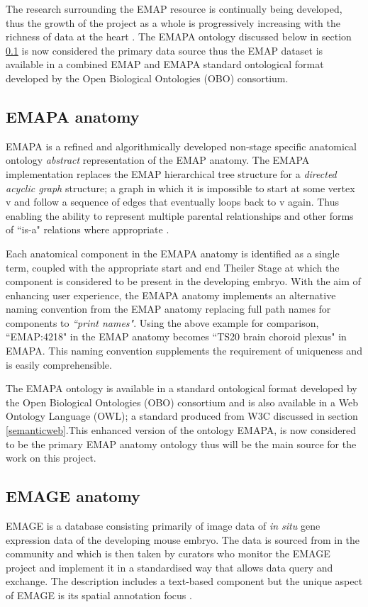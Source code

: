 The research surrounding the EMAP resource is continually being developed, thus the growth of the project as a whole is progressively increasing with the richness of data at the heart \cite{emap}. The EMAPA ontology discussed below in section \ref{emapaanatomy} is now considered the primary data source thus the EMAP dataset is available in a combined EMAP and EMAPA standard ontological format developed by the Open Biological Ontologies (OBO) consortium.

\subsection{EMAPA anatomy}\label{emapaanatomy}
EMAPA is a refined and algorithmically developed non-stage specific anatomical ontology \textit{abstract} representation of the EMAP anatomy. The EMAPA implementation replaces the EMAP hierarchical tree structure for a \textit{directed acyclic graph} structure; a graph in which it is impossible to start at some vertex v and follow a sequence of edges that eventually loops back to v again. Thus enabling the ability to represent multiple parental relationships and other forms of ``is-a" relations where appropriate \cite{emap}.

Each anatomical component in the EMAPA anatomy is identified as a single term, coupled with the appropriate start and end Theiler Stage at which the component is considered to be present in the developing embryo. \cite{emap} With the aim of enhancing user experience, the EMAPA anatomy  implements an alternative naming convention from the EMAP anatomy replacing full path names for components to \textit{``print names"}. Using the above example for comparison, ``EMAP:4218" in the EMAP anatomy becomes ``TS20 brain choroid plexus" in EMAPA. This naming convention supplements the requirement of uniqueness and is easily comprehensible.

The EMAPA ontology is available in a standard ontological format developed by the Open Biological Ontologies (OBO) consortium and is also available in a Web Ontology Language (OWL); a standard produced from W3C discussed in section \ref{semanticweb}.This enhanced version of the ontology EMAPA, is now considered to be the primary EMAP anatomy ontology thus will be the main source for the work on this project.

\subsection{EMAGE anatomy}
EMAGE is a database consisting primarily of image data of \textit{in situ} gene expression data of the developing mouse embryo. The data is sourced from in the community and which is then taken by curators who monitor the EMAGE project and implement it in a standardised way that allows data query and exchange. The description includes a text-based component but the unique aspect of EMAGE is its spatial annotation focus \cite{emap}.


